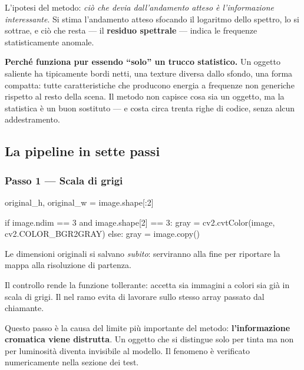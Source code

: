 L'ipotesi del metodo: \emph{ciò che devia dall'andamento atteso è l'informazione interessante}.
Si stima l'andamento atteso sfocando il logaritmo dello spettro, lo si sottrae, e ciò che resta
--- il \textbf{residuo spettrale} --- indica le frequenze statisticamente anomale.

\begin{nota}
\textbf{Perché funziona pur essendo ``solo'' un trucco statistico.} Un oggetto saliente ha
tipicamente bordi netti, una texture diversa dallo sfondo, una forma compatta: tutte
caratteristiche che producono energia a frequenze non generiche rispetto al resto della scena.
Il metodo non capisce cosa sia un oggetto, ma la statistica è un buon sostituto --- e costa circa
trenta righe di codice, senza alcun addestramento.
\end{nota}

\subsection{La pipeline in sette passi}

\subsubsection{Passo 1 --- Scala di grigi}

\begin{idebox}
\begin{pycode}
original_h, original_w = image.shape[:2]

if image.ndim == 3 and image.shape[2] == 3:
    gray = cv2.cvtColor(image, cv2.COLOR_BGR2GRAY)
else:
    gray = image.copy()
\end{pycode}
\end{idebox}

Le dimensioni originali si salvano \emph{subito}: serviranno alla fine per riportare la mappa
alla risoluzione di partenza.

Il controllo  rende la funzione tollerante: accetta
sia immagini a colori sia già in scala di grigi. Il  nel ramo  evita di
lavorare sullo stesso array passato dal chiamante.

\begin{attenzione}
Questo passo è la causa del limite più importante del metodo: \textbf{l'informazione cromatica
viene distrutta}. Un oggetto che si distingue solo per tinta ma non per luminosità diventa
invisibile al modello. Il fenomeno è verificato numericamente nella sezione dei test.
\end{attenzione}

